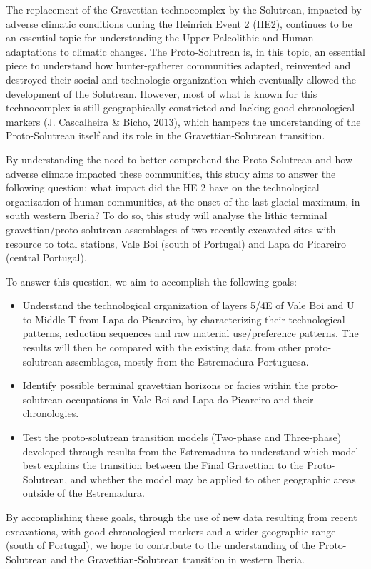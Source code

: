 \documentclass[12pt,twoside]{reedthesis}
\begin{document}
The replacement of the Gravettian technocomplex by the Solutrean, impacted by adverse climatic conditions during the Heinrich Event 2 (HE2), continues to be an essential topic for understanding the Upper Paleolithic and Human adaptations to climatic changes. The Proto-Solutrean is, in this topic, an essential piece to understand how hunter-gatherer communities adapted, reinvented and destroyed their social and technologic organization which eventually allowed the development of the Solutrean. However, most of what is known for this technocomplex is still geographically constricted and lacking good chronological markers (J. Cascalheira \& Bicho, 2013), which hampers the understanding of the Proto-Solutrean itself and its role in the Gravettian-Solutrean transition.

By understanding the need to better comprehend the Proto-Solutrean and how adverse climate impacted these communities, this study aims to answer the following question: what impact did the HE 2 have on the technological organization of human communities, at the onset of the last glacial maximum, in south western Iberia? To do so, this study will analyse the lithic terminal gravettian/proto-solutrean assemblages of two recently excavated sites with resource to total stations, Vale Boi (south of Portugal) and Lapa do Picareiro (central Portugal).

To answer this question, we aim to accomplish the following goals:
\begin{itemize}
\item
  Understand the technological organization of layers 5/4E of Vale Boi and U to Middle T from Lapa do Picareiro, by characterizing their technological patterns, reduction sequences and raw material use/preference patterns. The results will then be compared with the existing data from other proto-solutrean assemblages, mostly from the Estremadura Portuguesa.
\item
  Identify possible terminal gravettian horizons or facies within the proto-solutrean occupations in Vale Boi and Lapa do Picareiro and their chronologies.
\item
  Test the proto-solutrean transition models (Two-phase and Three-phase) developed through results from the Estremadura to understand which model best explains the transition between the Final Gravettian to the Proto-Solutrean, and whether the model may be applied to other geographic areas outside of the Estremadura.
\end{itemize}
By accomplishing these goals, through the use of new data resulting from recent excavations, with good chronological markers and a wider geographic range (south of Portugal), we hope to contribute to the understanding of the Proto-Solutrean and the Gravettian-Solutrean transition in western Iberia.
\end{document}
